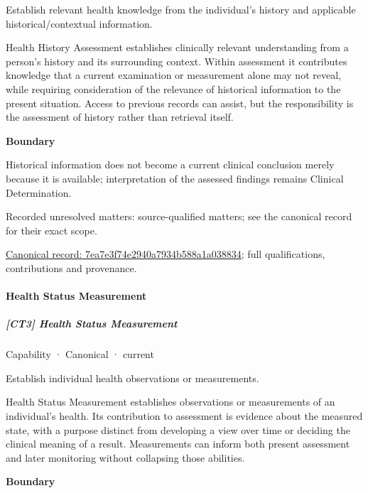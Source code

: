 Establish relevant health knowledge from the individual’s history and applicable historical/contextual information.



Health History Assessment establishes clinically relevant understanding from a person's history and its surrounding context. Within assessment it contributes knowledge that a current examination or measurement alone may not reveal, while requiring consideration of the relevance of historical information to the present situation. Access to previous records can assist, but the responsibility is the assessment of history rather than retrieval itself.



\textbf{Boundary}



Historical information does not become a current clinical conclusion merely because it is available; interpretation of the assessed findings remains Clinical Determination.


{\small Recorded unresolved matters: source-qualified matters; see the canonical record for their exact scope.}\par
{\footnotesize \href{../../../../continuum/strategy/capability/7ea7e3f74e2940a7934b588a1a038834.md}{Canonical record: 7ea7e3f74e2940a7934b588a1a038834}; full qualifications, contributions and provenance.}\par
\paragraph{Health Status Measurement}

\subparagraph{[CT3] Health Status Measurement}

\label{element:a796bfb3335d44f6aeb9970628ed8554}
{\small Capability · Canonical · current}\par

Establish individual health observations or measurements.



Health Status Measurement establishes observations or measurements of an individual's health. Its contribution to assessment is evidence about the measured state, with a purpose distinct from developing a view over time or deciding the clinical meaning of a result. Measurements can inform both present assessment and later monitoring without collapsing those abilities.



\textbf{Boundary}



